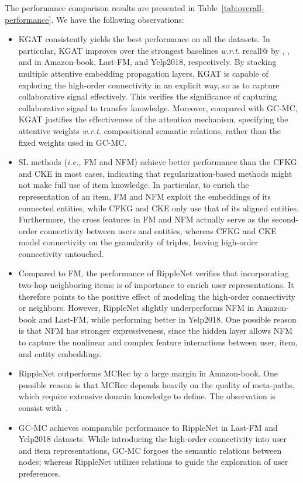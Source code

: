 \documentclass[sigconf]{acmart}
\newcommand{\ie}{\emph{i.e., }}
\newcommand{\wrt}{\emph{w.r.t. }}
\theoremstyle{definition}
\begin{document}
The performance comparison results are presented in Table~\ref{tab:overall-performance}. We have the following observations:
\begin{itemize}[leftmargin=*]
    \item KGAT consistently yields the best performance on all the datasets. In particular, KGAT improves over the strongest baselines \wrt recall@ by , , and  in Amazon-book, Last-FM, and Yelp2018, respectively.
    By stacking multiple attentive embedding propagation layers, KGAT is capable of exploring the high-order connectivity in an explicit way, so as to capture collaborative signal effectively.
    This verifies the significance of capturing collaborative signal to transfer knowledge.
    Moreover, compared with GC-MC, KGAT justifies the effectiveness of the attention mechanism, specifying the attentive weights \wrt compositional semantic relations, rather than the fixed weights used in GC-MC.
    
    \item SL methods (\ie FM and NFM) achieve better performance than the CFKG and CKE in most cases, indicating that regularization-based methods might not make full use of item knowledge. In particular, to enrich the representation of an item, FM and NFM exploit the embeddings of its connected entities, while CFKG and CKE only use that of its aligned entities. Furthermore, the cross features in FM and NFM actually serve as the second-order connectivity between users and entities, whereas CFKG and CKE model connectivity on the granularity of triples, leaving high-order connectivity untouched.
    


    \item Compared to FM, the performance of RippleNet verifies that incorporating two-hop neighboring items is of importance to enrich user representations. It therefore points to the positive effect of modeling the high-order connectivity or neighbors. However, RippleNet slightly underperforms NFM in Amazon-book and Last-FM, while performing better in Yelp2018.
    One possible reason is that NFM has stronger expressiveness, since the hidden layer allows NFM to capture the nonlinear and complex feature interactions between user, item, and entity embeddings.
    
    \item RippleNet outperforms MCRec by a large margin in Amazon-book. One possible reason is that MCRec depends heavily on the quality of meta-paths, which require extensive domain knowledge to define. The observation is consist with~\cite{RippleNet}.
    
    \item GC-MC achieves comparable performance to RippleNet in Last-FM and Yelp2018 datasets. While introducing the high-order connectivity into user and item representations, GC-MC forgoes the semantic relations between nodes; whereas RippleNet utilizes relations to guide the exploration of user preferences.
    
    
\end{itemize}
\end{document}
